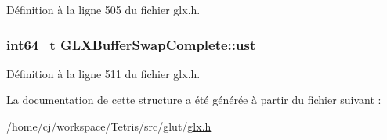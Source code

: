 Définition à la ligne 505 du fichier glx.\-h.

\hypertarget{struct_g_l_x_buffer_swap_complete_ab0dfbf0a8ea5e9f274bd4564fd0b64b2}{
\subsubsection[{ust}]{\setlength{\rightskip}{0pt plus 5cm}int64\-\_\-t G\-L\-X\-Buffer\-Swap\-Complete\-::ust}}\label{struct_g_l_x_buffer_swap_complete_ab0dfbf0a8ea5e9f274bd4564fd0b64b2}


Définition à la ligne 511 du fichier glx.\-h.



La documentation de cette structure a été générée à partir du fichier suivant \-:\begin{DoxyCompactItemize}
\item 
/home/cj/workspace/\-Tetris/src/glut/\hyperlink{glx_8h}{glx.\-h}\end{DoxyCompactItemize}
